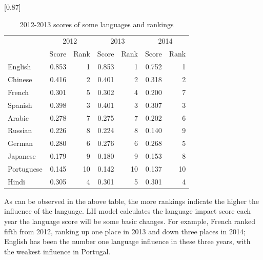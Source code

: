 \begin{table}[H]
	\centering
	\caption{2012-2013 scores of some languages and rankings}
	 \scalebox{0.87}[0.87]{%
	\begin{tabular}{|p{4.11em}|r|r|r|r|r|r|}
		\toprule
		\multicolumn{1}{|c|}{\multirow{2}[4]{*}{\backslashbox[0pt][l]{Language}{Time}}} & \multicolumn{2}{c}{2012} & \multicolumn{2}{c}{2013} & \multicolumn{2}{c|}{2014} \\
		\cmidrule{2-7}    \multicolumn{1}{|c|}{} & \multicolumn{1}{p{4.11em}|}{Score} & \multicolumn{1}{p{4.11em}|}{Rank} & \multicolumn{1}{p{4.055em}|}{Score} & \multicolumn{1}{p{4.055em}|}{Rank} & \multicolumn{1}{p{4.055em}|}{Score} & \multicolumn{1}{p{4.055em}|}{Rank} \\
    \midrule
	English & 0.853  & 1     & 0.853  & 1     & 0.752  & 1 \\
	\midrule
	Chinese & 0.416  & 2     & 0.401  & 2     & 0.318  & 2 \\
	\midrule
	French & 0.301  & 5     & 0.302  & 4     & 0.200  & 7 \\
	\midrule
	Spanish & 0.398  & 3     & 0.401  & 3     & 0.307  & 3 \\
	\midrule
	Arabic & 0.278  & 7     & 0.275  & 7     & 0.202  & 6 \\
	\midrule
	Russian & 0.226  & 8     & 0.224  & 8     & 0.140  & 9 \\
	\midrule
	German & 0.280  & 6     & 0.276  & 6     & 0.268  & 5 \\
	\midrule
	Japanese & 0.179  & 9     & 0.180  & 9     & 0.153  & 8 \\
	\midrule
	Portuguese & 0.145  & 10    & 0.142  & 10    & 0.137  & 10 \\
	\midrule
	Hindi & 0.305  & 4     & 0.301  & 5     & 0.301  & 4 \\
	\bottomrule
	\end{tabular}%
}
	\label{tab:012}%
\end{table}%

\par As can be observed in the above table, the more rankings indicate the higher the influence of the language. LII model calculates the language impact score each year the language score will be some basic changes. For example, French ranked fifth from 2012, ranking up one place in 2013 and down three places in 2014; English has been the number one language influence in these three years, with the weakest influence in Portugal.

